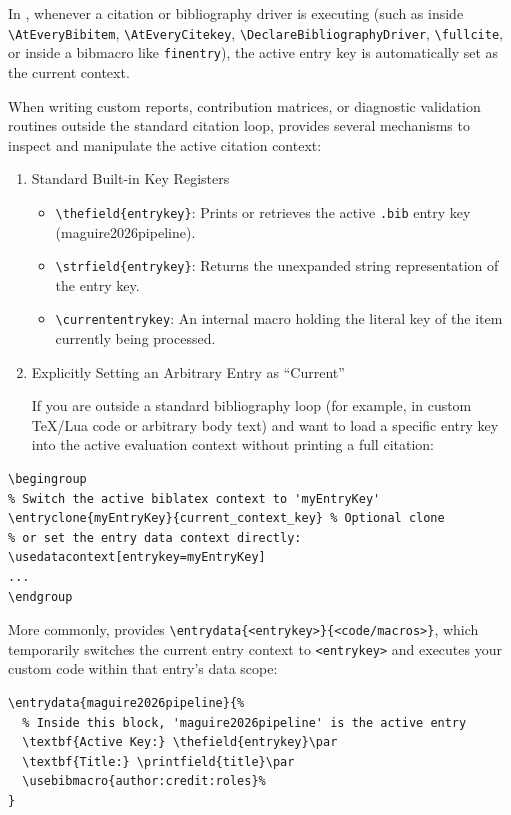 \documentclass[12pt, twoside]{article}
\newcommand{\fname}[1]{\texttt{#1}}
\begin{document}
In \BibLaTeX, whenever a citation or bibliography driver is executing (such as inside \texttt{\textbackslash AtEveryBibitem}, \texttt{\textbackslash AtEveryCitekey}, \texttt{\textbackslash DeclareBibliographyDriver}, \texttt{\textbackslash fullcite}, or inside a bibmacro like \texttt{finentry}), the active entry key is automatically set as the current context.

When writing custom reports, contribution matrices, or diagnostic validation routines outside the standard citation loop, \BibLaTeX{} provides several mechanisms to inspect and manipulate the active citation context:
\begin{enumerate}
    \item Standard Built-in Key Registers
    \begin{itemize}
        \item \texttt{\textbackslash thefield\{entrykey\}}: Prints or retrieves the active \fname{.bib} entry key (\eg maguire2026pipeline).

        \item \texttt{\textbackslash strfield\{entrykey\}}: Returns the unexpanded string representation of the entry key.

        \item \texttt{\textbackslash currententrykey}: An internal macro holding the literal key of the item currently being processed.
    \end{itemize}
    
    \item Explicitly Setting an Arbitrary Entry as \enquote{Current}
    
If you are outside a standard bibliography loop (for example, in custom TeX/Lua code or arbitrary body text) and want to load a specific entry key into the active \BibLaTeX{} evaluation context without printing a full citation:
\end{enumerate}

\begin{lstlisting}[style=latexExampleForAuthors, escapechar=|, basicstyle=\footnotesize, caption={{Load specific entry key}}, label=lst:biberLoadSpecifcEntryKey]
\begingroup
% Switch the active biblatex context to 'myEntryKey'
\entryclone{myEntryKey}{current_context_key} % Optional clone
% or set the entry data context directly:
\usedatacontext[entrykey=myEntryKey]
...
\endgroup
\end{lstlisting}

More commonly, \BibLaTeX{} provides \texttt{\textbackslash entrydata\{<entrykey>\}\{<code/macros>\}}, which temporarily switches the current entry context to \texttt{<entrykey>} and executes your custom code within that entry's data scope:
\begin{lstlisting}[style=latexExampleForAuthors, escapechar=|, basicstyle=\footnotesize, caption={{Temporary switch to specific entry key}}, label=lst:biberTemporarySwitchSpecifcEntryKey]
\entrydata{maguire2026pipeline}{%
  % Inside this block, 'maguire2026pipeline' is the active entry
  \textbf{Active Key:} \thefield{entrykey}\par
  \textbf{Title:} \printfield{title}\par
  \usebibmacro{author:credit:roles}%
}
\end{lstlisting}
\end{document}
